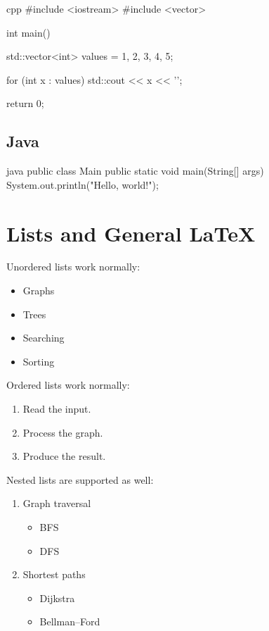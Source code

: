 \documentclass{csdept}
\begin{document}
\begin{code}{cpp}
#include <iostream>
#include <vector>

int main() {
    std::vector<int> values = {1, 2, 3, 4, 5};

    for (int x : values) {
        std::cout << x << '\n';
    }

    return 0;
}
\end{code}

\subsection{Java}

\begin{code}{java}
public class Main {
    public static void main(String[] args) {
        System.out.println("Hello, world!");
    }
}
\end{code}

\section{Lists and General LaTeX}

Unordered lists work normally:

\begin{itemize}
    \item Graphs
    \item Trees
    \item Searching
    \item Sorting
\end{itemize}

Ordered lists work normally:

\begin{enumerate}
    \item Read the input.
    \item Process the graph.
    \item Produce the result.
\end{enumerate}

Nested lists are supported as well:

\begin{enumerate}
    \item Graph traversal

    \begin{itemize}
        \item BFS
        \item DFS
    \end{itemize}

    \item Shortest paths

    \begin{itemize}
        \item Dijkstra
        \item Bellman--Ford
    \end{itemize}
\end{enumerate}
\end{document}
